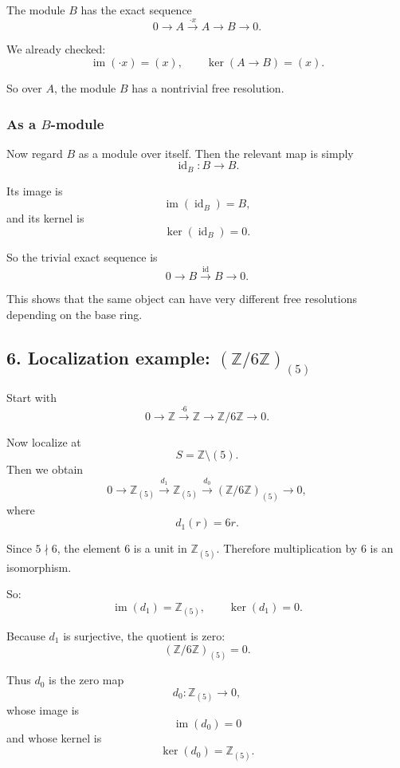 \documentclass[12pt,a4paper]{article}
\theoremstyle{notespace}
\theoremstyle{definition}
\begin{document}
The module \(B\) has the exact sequence
\[
0 \longrightarrow A \xrightarrow{\cdot x} A \longrightarrow B \longrightarrow 0.
\]

We already checked:
\[
\operatorname{im}(\cdot x)=(x), \qquad \ker(A\to B)=(x).
\]

So over \(A\), the module \(B\) has a nontrivial free resolution.

\subsubsection*{As a \(B\)-module}

Now regard \(B\) as a module over itself. Then the relevant map is simply
\[
\operatorname{id}_B:B\to B.
\]

Its image is
\[
\operatorname{im}(\operatorname{id}_B)=B,
\]
and its kernel is
\[
\ker(\operatorname{id}_B)=0.
\]

So the trivial exact sequence is
\[
0 \longrightarrow B \xrightarrow{\operatorname{id}} B \longrightarrow 0.
\]

This shows that the same object can have very different free resolutions depending on the base ring.

\bigskip

\subsection{6. Localization example: \((\mathbb Z/6\mathbb Z)_{(5)}\)}

Start with
\[
0 \longrightarrow \mathbb Z \xrightarrow{\cdot 6} \mathbb Z \longrightarrow \mathbb Z/6\mathbb Z \longrightarrow 0.
\]

Now localize at
\[
S=\mathbb Z\setminus (5).
\]
Then we obtain
\[
0 \longrightarrow \mathbb Z_{(5)} \xrightarrow{d_1} \mathbb Z_{(5)} \xrightarrow{d_0} (\mathbb Z/6\mathbb Z)_{(5)} \longrightarrow 0,
\]
where
\[
d_1(r)=6r.
\]

Since \(5\nmid 6\), the element \(6\) is a unit in \(\mathbb Z_{(5)}\). Therefore multiplication by \(6\) is an isomorphism.

So:
\[
\operatorname{im}(d_1)=\mathbb Z_{(5)},
\qquad
\ker(d_1)=0.
\]

Because \(d_1\) is surjective, the quotient is zero:
\[
(\mathbb Z/6\mathbb Z)_{(5)}=0.
\]

Thus \(d_0\) is the zero map
\[
d_0:\mathbb Z_{(5)}\to 0,
\]
whose image is
\[
\operatorname{im}(d_0)=0
\]
and whose kernel is
\[
\ker(d_0)=\mathbb Z_{(5)}.
\]
\end{document}
